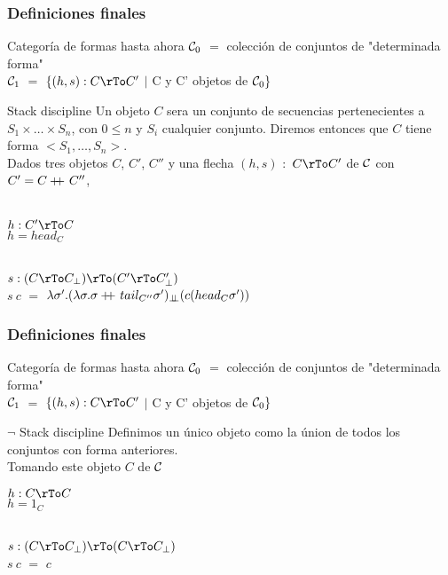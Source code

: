 \documentclass{beamer} %
\begin{document}
\begin{frame}\small
\frametitle{Definiciones finales}

\begin{block}{Categor\'ia de formas hasta ahora}
$\mathcal{C}_0$ $=$ colecci\'on de conjuntos de "determinada forma"\\
$\mathcal{C}_1$ $=$ $\{(h,s): C \rTo C' $ $|$  C y C' objetos de $\mathcal{C}_0 \}$ \\
\end{block}

\begin{block}{Stack discipline}
Un objeto $C$ sera un conjunto de secuencias pertenecientes a $S_1 \times \ldots \times S_n$, 
con $0 \leq n$ y $S_i$ cualquier conjunto. Diremos entonces que $C$ tiene forma $<S_1,\ldots,S_n>$.\\
Dados tres objetos $C$, $C'$, $C''$ y una flecha $(h,s)$ $:$ $C \rTo C'$ de $\mathcal{C}$ con $C' = C +\kern-1.3ex+\kern0.8ex C''$,\\
\

$h: C' \rTo C$\\
$h = head_{C}$\\
\

$s: (C \rTo C_\bot) \rTo (C' \rTo C'_\bot)$\\
$s \ c$ $=$ $\lambda \sigma' . (\lambda \sigma . \sigma +\kern-1.3ex+\kern0.8ex tail_{C''}\sigma')_{\bot \!\!\! \bot}(c(head_C \sigma'))$

\end{block}
\end{frame}

\begin{frame}
\frametitle{Definiciones finales}

\begin{block}{Categor\'ia de formas hasta ahora}
$\mathcal{C}_0$ $=$ colecci\'on de conjuntos de "determinada forma"\\
$\mathcal{C}_1$ $=$ $\{(h,s): C \rTo C' $ $|$  C y C' objetos de $\mathcal{C}_0 \}$ \\
\end{block}

\begin{block}{$\neg$ Stack discipline}
Definimos un \'unico objeto como la \'union de todos los conjuntos con forma anteriores.\\
Tomando este objeto $C$ de $\mathcal{C}$
\

$h: C \rTo C$\\
$h = 1_C$\\
\

$s: (C \rTo C_\bot) \rTo (C \rTo C_\bot)$\\
$s \ c$ $=$ $c$

\end{block}
\end{frame}
\end{document}
